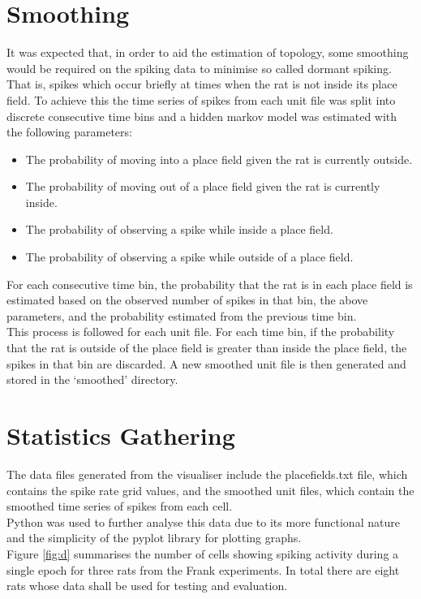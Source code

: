 \documentclass[11pt]{report}
\begin{document}
\newpage

\section{Smoothing}
It was expected that, in order to aid the estimation of topology, some smoothing would be required on the spiking data to minimise so called dormant spiking. That is, spikes which occur briefly at times when the rat is not inside its place field. To achieve this the time series of spikes from each unit file was split into discrete consecutive time bins and a hidden markov model was estimated with the following parameters:
 
\begin{itemize}
\item The probability of moving into a place field given the rat is currently outside.
\item The probability of moving out of a place field given the rat is currently inside.
\item The probability of observing a spike while inside a place field.
\item The probability of observing a spike while outside of a place field.
\end{itemize}
 
For each consecutive time bin, the probability that the rat is in each place field is estimated based on the observed number of spikes in that bin, the above parameters, and the probability estimated from the previous time bin. \\
This process is followed for each unit file. For each time bin, if the probability that the rat is outside of the place field is greater than inside the place field, the spikes in that bin are discarded. A new smoothed unit file is then generated and stored in the `smoothed' directory.

\section{Statistics Gathering}
The data files generated from the visualiser include the placefields.txt file, which contains the spike rate grid values, and the smoothed unit files, which contain the smoothed time series of spikes from each cell.\\
Python was used to further analyse this data due to its more functional nature and the simplicity of the pyplot library for plotting graphs.\\
Figure \ref{fig:d} summarises the number of cells showing spiking activity during a single epoch for three rats from the Frank experiments. In total there are eight rats whose data shall be used for testing and evaluation.
\end{document}
